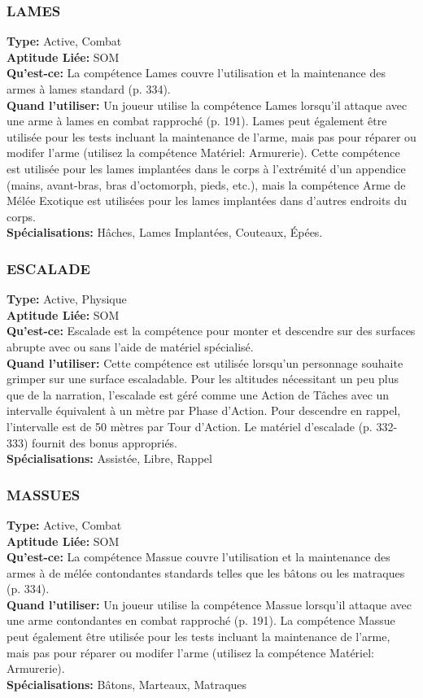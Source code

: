 \subsubsection{LAMES} \textbf{Type:} Active, Combat \\ \textbf{Aptitude Liée:} SOM \\ \textbf{Qu'est-ce:} La compétence Lames couvre l'utilisation et la maintenance des armes à lames standard (p. 334). \\ \textbf{Quand l'utiliser:} Un joueur utilise la compétence Lames lorsqu'il attaque avec une arme à lames en combat rapproché (p. 191). Lames peut également être utilisée pour les tests incluant la maintenance de l'arme, mais pas pour réparer ou modifer l'arme (utilisez la compétence Matériel: Armurerie). Cette compétence est utilisée pour les lames implantées dans le corps à l'extrémité d'un appendice (mains, avant-bras, bras d'octomorph, pieds, etc.), mais la compétence Arme de Mélée Exotique est utilisées pour les lames implantées dans d'autres endroits du corps. \\ \textbf{Spécialisations:} Hâches, Lames Implantées, Couteaux, Épées. 

\subsubsection{ESCALADE} \textbf{Type:} Active, Physique\\ \textbf{Aptitude Liée:} SOM \\ \textbf{Qu'est-ce:} Escalade est la compétence pour monter et descendre sur des surfaces abrupte avec ou sans l'aide de matériel spécialisé. \\ \textbf{Quand l'utiliser:} Cette compétence est utilisée lorsqu'un personnage souhaite grimper sur une surface escaladable. Pour les altitudes nécessitant un peu plus que de la narration, l'escalade est géré comme une Action de Tâches avec un intervalle équivalent à un mètre par Phase d'Action. Pour descendre en rappel, l'intervalle est de 50 mètres par Tour d'Action. Le matériel d'escalade (p. 332-333) fournit des bonus appropriés. \\ \textbf{Spécialisations:} Assistée, Libre, Rappel 



\subsubsection{MASSUES} \textbf{Type:} Active, Combat \\ \textbf{Aptitude Liée:} SOM \\ \textbf{Qu'est-ce:} La compétence Massue couvre l'utilisation et la maintenance des armes à de mélée contondantes standards telles que les bâtons ou les matraques (p. 334). \\ \textbf{Quand l'utiliser:} Un joueur utilise la compétence Massue lorsqu'il attaque avec une arme contondantes en combat rapproché (p. 191). La compétence Massue peut également être utilisée pour les tests incluant la maintenance de l'arme, mais pas pour réparer ou modifer l'arme (utilisez la compétence Matériel: Armurerie). \\ \textbf{Spécialisations:} Bâtons, Marteaux, Matraques 

